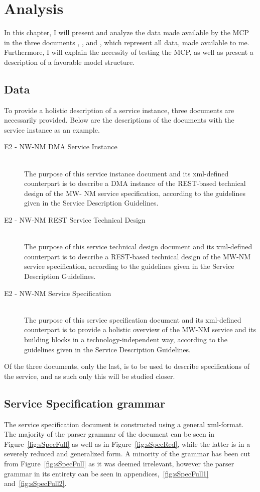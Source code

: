 \chapter{Analysis}

In this chapter, I will present and analyze the data made available by the MCP in the three documents , , and , which represent all data, made available to me. Furthermore, I will explain the necessity of testing the MCP, as well as present a description of a favorable model structure. 

\section{Data}

To provide a holistic description of a service instance, three documents are necessarily provided. Below are the descriptions of the documents with the service instance  as an example.
\begin{description}
	\item[E2 - NW-NM DMA Service Instance]\ \\
		The purpose of this service instance document and its xml-defined counterpart is to describe a DMA instance of the REST-based technical design of the MW- NM service specification, according to the guidelines given in the Service Description Guidelines.
	\item[E2 - NW-NM REST Service Technical Design]\ \\
		The purpose of this service technical design document and its xml-defined counterpart is to describe a REST-based technical design of the MW-NM service specification, according to the guidelines given in the Service Description Guidelines.
	\item[E2 - NW-NM Service Specification]\ \\
		The purpose of this service specification document and its xml-defined counterpart is to provide a holistic overview of the MW-NM service and its building blocks in a technology-independent way, according to the guidelines given in the Service Description Guidelines.
\end{description}
Of the three documents, only the last,  is to be used to describe specifications of the service, and as such only this will be studied closer.
\section{Service Specification grammar}
The service specification document is constructed using a general xml-format. The majority of the parser grammar of the document can be seen in Figure~\ref{fig:sSpecFull} as well as in Figure~\ref{fig:sSpecRed}, while the latter is in a severely reduced and generalized form. A minority of the grammar has been cut from Figure~\ref{fig:sSpecFull} as it was deemed irrelevant, however the parser grammar in its entirety can be seen in appendices,~\ref{fig:sSpecFull1} and~\ref{fig:sSpecFull2}.

